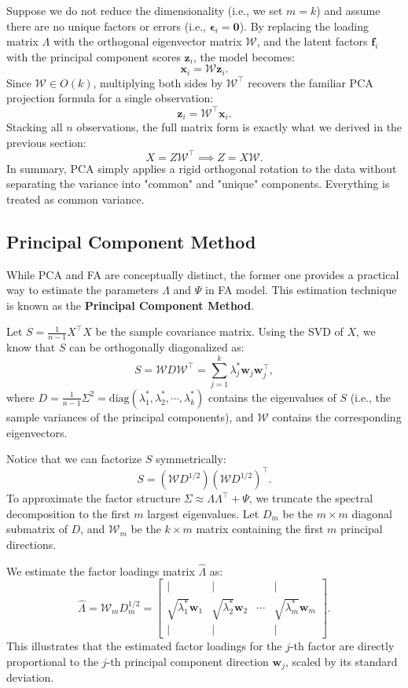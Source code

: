 \documentclass[12pt]{article}
\begin{document}
Suppose we do not reduce the dimensionality (i.e., we set $m = k$) and assume there are no unique factors or errors (i.e., $\boldsymbol{\epsilon}_i = \mathbf{0}$). By replacing the loading matrix $\Lambda$ with the orthogonal eigenvector matrix $\mathcal{W}$, and the latent factors $\mathbf{f}_i$ with the principal component scores $\mathbf{z}_i$, the model becomes:
\[
\mathbf{x}_i = \mathcal{W} \mathbf{z}_i.
\]
Since $\mathcal{W} \in O(k)$, multiplying both sides by $\mathcal{W}^\top$ recovers the familiar PCA projection formula for a single observation:
\[
\mathbf{z}_i = \mathcal{W}^\top \mathbf{x}_i.
\]
Stacking all $n$ observations, the full matrix form is exactly what we derived in the previous section:
\[
X = Z \mathcal{W}^\top \implies Z = X \mathcal{W}.
\]
In summary, PCA simply applies a rigid orthogonal rotation to the data without separating the variance into "common" and "unique" components. Everything is treated as common variance.


\subsection{Principal Component Method}

While PCA and FA are conceptually distinct, the former one provides a practical way to estimate the parameters $\Lambda$ and $\Psi$ in FA model. This estimation technique is known as the \textbf{Principal Component Method}.

Let $S = \frac{1}{n-1} X^\top X$ be the sample covariance matrix. Using the SVD of $X$, we know that $S$ can be orthogonally diagonalized as:
\[
S = \mathcal{W} D \mathcal{W}^\top = \sum_{j=1}^{k} \lambda^*_j \mathbf{w}_j \mathbf{w}_j^\top,
\]
where $D = \frac{1}{n-1}\Sigma^2 = \text{diag}(\lambda^*_1, \lambda^*_2, \cdots, \lambda^*_k)$ contains the eigenvalues of $S$ (i.e., the sample variances of the principal components), and $\mathcal{W}$ contains the corresponding eigenvectors. 

Notice that we can factorize $S$ symmetrically:
\[
S = (\mathcal{W} D^{1/2}) (\mathcal{W} D^{1/2})^\top.
\]
To approximate the factor structure $\Sigma \approx \Lambda\Lambda^\top + \Psi$, we truncate the spectral decomposition to the first $m$ largest eigenvalues. Let $D_m$ be the $m \times m$ diagonal submatrix of $D$, and $\mathcal{W}_m$ be the $k \times m$ matrix containing the first $m$ principal directions.

We estimate the factor loadings matrix $\widehat{\Lambda}$ as:
\begin{equation}
\widehat{\Lambda} = \mathcal{W}_m D_m^{1/2} = 
\begin{bmatrix}
| & | & & | \\
\sqrt{\lambda^*_1}\mathbf{w}_1 & \sqrt{\lambda^*_2}\mathbf{w}_2 & \cdots & \sqrt{\lambda^*_m}\mathbf{w}_m \\
| & | & & |
\end{bmatrix}.
\end{equation}
This illustrates that the estimated factor loadings for the $j$-th factor are directly proportional to the $j$-th principal component direction $\mathbf{w}_j$, scaled by its standard deviation.
\end{document}
